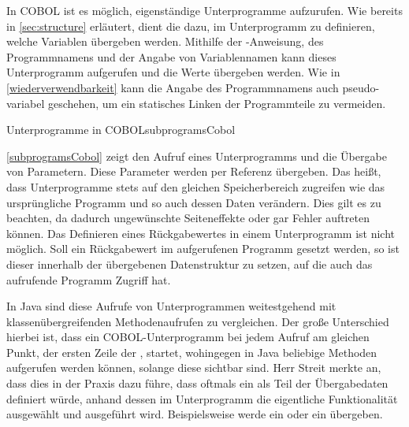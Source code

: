 In COBOL ist es möglich, eigenständige Unterprogramme aufzurufen. Wie bereits in \autoref{sec:structure} erläutert, dient die  dazu, im Unterprogramm zu definieren, welche Variablen übergeben werden. Mithilfe der -Anweisung, des Programmnamens und der Angabe von Variablennamen kann dieses Unterprogramm aufgerufen und die Werte übergeben werden. Wie in \autoref{wiederverwendbarkeit} kann die Angabe des Programmnamens auch pseudo-variabel geschehen, um ein statisches Linken der Programmteile zu vermeiden. 

\begin{codeWithCaption}{Unterprogramme in COBOL}{subprogramsCobol}
 \cFollow
{} \cFollow
{}
\end{codeWithCaption}

\autoref{subprogramsCobol} zeigt den Aufruf eines Unterprogramms und die Übergabe von Parametern. Diese Parameter werden per Referenz übergeben. Das heißt, dass Unterprogramme stets auf den gleichen Speicherbereich zugreifen wie das ursprüngliche Programm und so auch dessen Daten verändern. Dies gilt es zu beachten, da dadurch ungewünschte Seiteneffekte oder gar Fehler auftreten können. Das Definieren eines Rückgabewertes in einem Unterprogramm ist nicht möglich. Soll ein Rückgabewert im aufgerufenen Programm gesetzt werden, so ist dieser innerhalb der übergebenen Datenstruktur zu setzen, auf die auch das aufrufende Programm Zugriff hat. 

In Java sind diese Aufrufe von Unterprogrammen weitestgehend mit klassenübergreifenden Methodenaufrufen zu vergleichen. Der große Unterschied hierbei ist, dass ein COBOL-Unterprogramm bei jedem Aufruf am gleichen Punkt, der ersten Zeile der , startet, wohingegen in Java beliebige Methoden aufgerufen werden können, solange diese sichtbar sind. Herr Streit merkte an, dass dies in der Praxis dazu führe, dass oftmals ein  als Teil der Übergabedaten definiert würde, anhand dessen im Unterprogramm die eigentliche Funktionalität ausgewählt und ausgeführt wird. Beispielsweise werde ein  oder ein  übergeben.